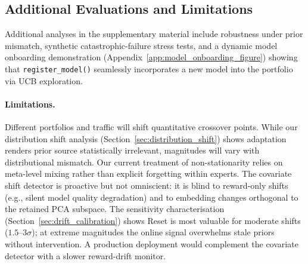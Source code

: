 





\subsection{Additional Evaluations and Limitations}
\label{sec:robustness_adaptation}
\label{sec:prior_degradation}
\label{sec:transfer_null}
\label{sec:limitations}

Additional analyses in the supplementary material include robustness under prior mismatch, synthetic catastrophic-failure stress tests, and a dynamic model onboarding demonstration (Appendix~\ref{app:model_onboarding_figure}) showing that \texttt{register\_model()} seamlessly incorporates a new model into the portfolio via UCB exploration.

\paragraph{Limitations.}
Different portfolios and traffic will shift quantitative crossover points. While our distribution shift analysis (Section~\ref{sec:distribution_shift}) shows adaptation renders prior source statistically irrelevant, magnitudes will vary with distributional mismatch. Our current treatment of non-stationarity relies on meta-level mixing rather than explicit forgetting within experts.
The covariate shift detector is proactive but not omniscient: it is blind to reward-only shifts (e.g., silent model quality degradation) and to embedding changes orthogonal to the retained PCA subspace.  The sensitivity characterisation (Section~\ref{sec:drift_calibration}) shows Reset is most valuable for moderate shifts ($1.5$--$3\sigma$); at extreme magnitudes the online signal overwhelms stale priors without intervention.  A production deployment would complement the covariate detector with a slower reward-drift monitor.

